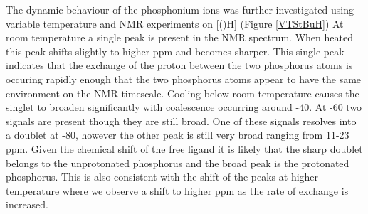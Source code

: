 {%

The dynamic behaviour of the phosphonium ions was further investigated using variable temperature \phosphorus{} and \proton{} NMR experiments on [(\tButhixantphos)H] (Figure \ref{VTStBuH})  At room temperature a single peak is present in the \phosphorus{} NMR spectrum.  When heated this peak shifts slightly to higher ppm and becomes sharper.  This single peak indicates that the exchange of the proton between the two phosphorus atoms is occuring rapidly enough that the two phosphorus atoms appear to have the same environment on the NMR timescale.  Cooling below room temperature causes the singlet to broaden significantly with coalescence occurring around -40\degC{}.  At -60\degC{} two signals are present though they are still broad.  One of these signals resolves into a doublet at -80\degC, however the other peak is still very broad ranging from 11-23 ppm.  Given the chemical shift of the free ligand it is likely that the sharp doublet belongs to the unprotonated phosphorus and the broad peak is the protonated phosphorus.  This is also consistent with the shift of the peaks at higher temperature where we observe a shift to higher ppm as the rate of exchange is increased.  

}
